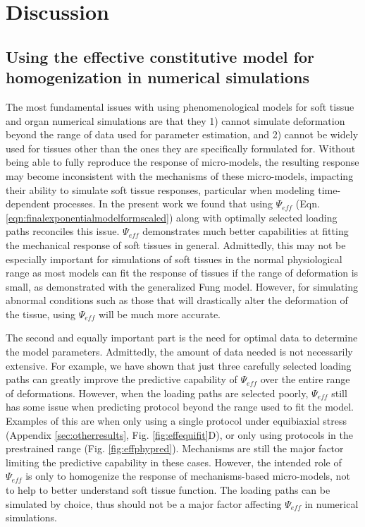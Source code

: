 
\section{Discussion}

\subsection{Using the effective constitutive model for homogenization in numerical simulations}

	The most fundamental issues with using phenomenological models for soft tissue and organ numerical simulations are that they 1) cannot simulate deformation beyond the range of data used for parameter estimation, and 2) cannot be widely used for tissues other than the ones they are specifically formulated for. Without being able to fully reproduce the response of micro-models, the resulting response may become inconsistent with the mechanisms of these micro-models, impacting their ability to simulate soft tissue responses, particular when modeling time-dependent processes. In the present work we found that using $\Psi_{eff}$ (Eqn. \ref{eqn:finalexponentialmodelformscaled}) along with optimally selected loading paths reconciles this issue. $\Psi_{eff}$ demonstrates much better capabilities at fitting the mechanical response of soft tissues in general. Admittedly, this may not be especially important for simulations of soft tissues in the normal physiological range as most models can fit the response of tissues if the range of deformation is small, as demonstrated with the generalized Fung model. However, for simulating abnormal conditions such as those that will drastically alter the deformation of the tissue, using $\Psi_{eff}$ will be much more accurate. 
    
    
    The second and equally important part is the need for optimal data to determine the model parameters. Admittedly, the amount of data needed is not necessarily extensive. For example, we have shown that just three carefully selected loading paths can greatly improve the predictive capability of $\Psi_{eff}$ over the entire range of deformations. However, when the loading paths are selected poorly, $\Psi_{eff}$ still has some issue when predicting protocol beyond the range used to fit the model. Examples of this are when only using a single protocol under equibiaxial stress (Appendix \ref{sec:otherresults}, Fig. \ref{fig:effequifit}D), or only using protocols in the prestrained range (Fig. \ref{fig:effphypred}). Mechanisms are still the major factor limiting the predictive capability in these cases. However, the intended role of $\Psi_{eff}$ is only to homogenize the response of mechanisms-based micro-models, not to help to better understand soft tissue function. The loading paths can be simulated by choice, thus should not be a major factor affecting $\Psi_{eff}$ in numerical simulations. 
    
